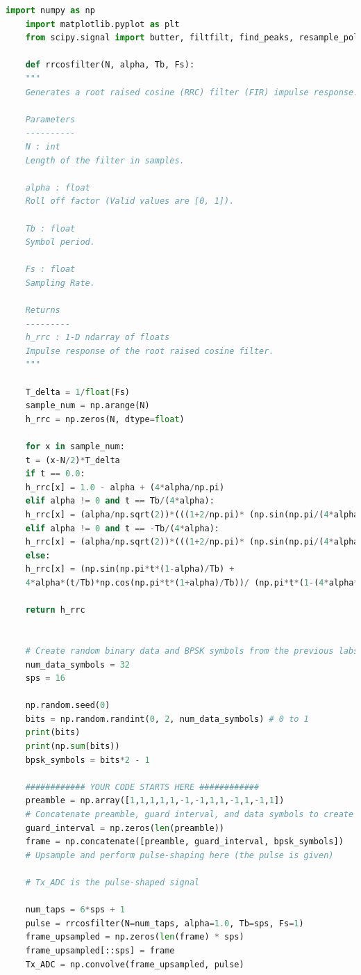 \documentclass[
	letterpaper, %
	10pt, %
]{CSUniSchoolLabReport}
\begin{document}
\begin{lstlisting}[language=Python]
	import numpy as np
	import matplotlib.pyplot as plt
	from scipy.signal import butter, filtfilt, find_peaks, resample_poly
	
	def rrcosfilter(N, alpha, Tb, Fs):
	"""
	Generates a root raised cosine (RRC) filter (FIR) impulse response.
	
	Parameters
	----------
	N : int
	Length of the filter in samples.
	
	alpha : float
	Roll off factor (Valid values are [0, 1]).
	
	Tb : float
	Symbol period.
	
	Fs : float
	Sampling Rate.
	
	Returns
	---------
	h_rrc : 1-D ndarray of floats
	Impulse response of the root raised cosine filter.
	"""
	
	T_delta = 1/float(Fs)
	sample_num = np.arange(N)
	h_rrc = np.zeros(N, dtype=float)
	
	for x in sample_num:
	t = (x-N/2)*T_delta
	if t == 0.0:
	h_rrc[x] = 1.0 - alpha + (4*alpha/np.pi)
	elif alpha != 0 and t == Tb/(4*alpha):
	h_rrc[x] = (alpha/np.sqrt(2))*(((1+2/np.pi)* (np.sin(np.pi/(4*alpha)))) + ((1-2/np.pi)*(np.cos(np.pi/(4*alpha)))))
	elif alpha != 0 and t == -Tb/(4*alpha):
	h_rrc[x] = (alpha/np.sqrt(2))*(((1+2/np.pi)* (np.sin(np.pi/(4*alpha)))) + ((1-2/np.pi)*(np.cos(np.pi/(4*alpha)))))
	else:
	h_rrc[x] = (np.sin(np.pi*t*(1-alpha)/Tb) +
	4*alpha*(t/Tb)*np.cos(np.pi*t*(1+alpha)/Tb))/ (np.pi*t*(1-(4*alpha*t/Tb)*(4*alpha*t/Tb))/Tb)
	
	return h_rrc
	
	
	# Create random binary data and BPSK symbols from the previous labs
	num_data_symbols = 32
	sps = 16
	
	np.random.seed(0)
	bits = np.random.randint(0, 2, num_data_symbols) # 0 to 1
	print(bits)
	print(np.sum(bits))
	bpsk_symbols = bits*2 - 1
	
	############ YOUR CODE STARTS HERE ############
	preamble = np.array([1,1,1,1,1,-1,-1,1,1,-1,1,-1,1])
	# Concatenate preamble, guard interval, and data symbols to create a frame here
	guard_interval = np.zeros(len(preamble))
	frame = np.concatenate([preamble, guard_interval, bpsk_symbols])
	# Upsample and perform pulse-shaping here (the pulse is given)
	
	# Tx_ADC is the pulse-shaped signal
	
	num_taps = 6*sps + 1
	pulse = rrcosfilter(N=num_taps, alpha=1.0, Tb=sps, Fs=1)
	frame_upsampled = np.zeros(len(frame) * sps)
	frame_upsampled[::sps] = frame
	Tx_ADC = np.convolve(frame_upsampled, pulse)
	

\end{lstlisting}
\end{document}

